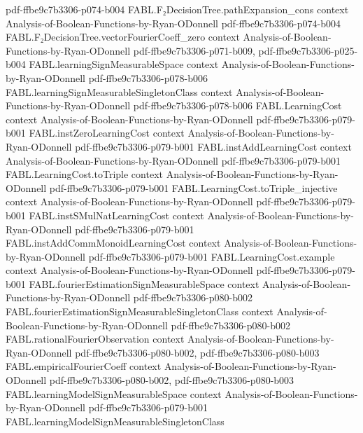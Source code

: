 \begin{theorem}
  {pdf-ffbe9c7b3306-p074-b004}
\proofstep
  {FABL.F₂DecisionTree.pathExpansion_cons}
  {context}
  {Analysis-of-Boolean-Functions-by-Ryan-ODonnell}
  {pdf-ffbe9c7b3306-p074-b004}
\proofstep
  {FABL.F₂DecisionTree.vectorFourierCoeff_zero}
  {context}
  {Analysis-of-Boolean-Functions-by-Ryan-ODonnell}
  {pdf-ffbe9c7b3306-p071-b009,
    pdf-ffbe9c7b3306-p025-b004}
\proofstep
  {FABL.learningSignMeasurableSpace}
  {context}
  {Analysis-of-Boolean-Functions-by-Ryan-ODonnell}
  {pdf-ffbe9c7b3306-p078-b006}
\proofstep
  {FABL.learningSignMeasurableSingletonClass}
  {context}
  {Analysis-of-Boolean-Functions-by-Ryan-ODonnell}
  {pdf-ffbe9c7b3306-p078-b006}
\proofstep
  {FABL.LearningCost}
  {context}
  {Analysis-of-Boolean-Functions-by-Ryan-ODonnell}
  {pdf-ffbe9c7b3306-p079-b001}
\proofstep
  {FABL.instZeroLearningCost}
  {context}
  {Analysis-of-Boolean-Functions-by-Ryan-ODonnell}
  {pdf-ffbe9c7b3306-p079-b001}
\proofstep
  {FABL.instAddLearningCost}
  {context}
  {Analysis-of-Boolean-Functions-by-Ryan-ODonnell}
  {pdf-ffbe9c7b3306-p079-b001}
\proofstep
  {FABL.LearningCost.toTriple}
  {context}
  {Analysis-of-Boolean-Functions-by-Ryan-ODonnell}
  {pdf-ffbe9c7b3306-p079-b001}
\proofstep
  {FABL.LearningCost.toTriple_injective}
  {context}
  {Analysis-of-Boolean-Functions-by-Ryan-ODonnell}
  {pdf-ffbe9c7b3306-p079-b001}
\proofstep
  {FABL.instSMulNatLearningCost}
  {context}
  {Analysis-of-Boolean-Functions-by-Ryan-ODonnell}
  {pdf-ffbe9c7b3306-p079-b001}
\proofstep
  {FABL.instAddCommMonoidLearningCost}
  {context}
  {Analysis-of-Boolean-Functions-by-Ryan-ODonnell}
  {pdf-ffbe9c7b3306-p079-b001}
\proofstep
  {FABL.LearningCost.example}
  {context}
  {Analysis-of-Boolean-Functions-by-Ryan-ODonnell}
  {pdf-ffbe9c7b3306-p079-b001}
\proofstep
  {FABL.fourierEstimationSignMeasurableSpace}
  {context}
  {Analysis-of-Boolean-Functions-by-Ryan-ODonnell}
  {pdf-ffbe9c7b3306-p080-b002}
\proofstep
  {FABL.fourierEstimationSignMeasurableSingletonClass}
  {context}
  {Analysis-of-Boolean-Functions-by-Ryan-ODonnell}
  {pdf-ffbe9c7b3306-p080-b002}
\proofstep
  {FABL.rationalFourierObservation}
  {context}
  {Analysis-of-Boolean-Functions-by-Ryan-ODonnell}
  {pdf-ffbe9c7b3306-p080-b002,
    pdf-ffbe9c7b3306-p080-b003}
\proofstep
  {FABL.empiricalFourierCoeff}
  {context}
  {Analysis-of-Boolean-Functions-by-Ryan-ODonnell}
  {pdf-ffbe9c7b3306-p080-b002,
    pdf-ffbe9c7b3306-p080-b003}
\proofstep
  {FABL.learningModelSignMeasurableSpace}
  {context}
  {Analysis-of-Boolean-Functions-by-Ryan-ODonnell}
  {pdf-ffbe9c7b3306-p079-b001}
\proofstep
  {FABL.learningModelSignMeasurableSingletonClass}

\end{theorem}
